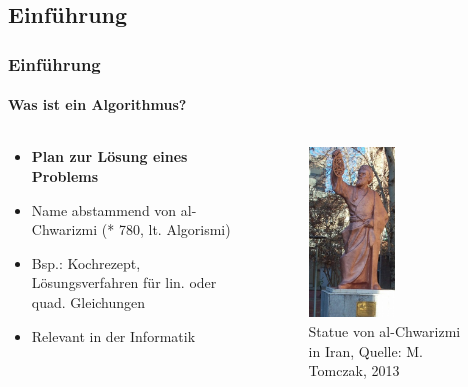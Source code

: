 \documentclass[professionalfont,serif,german]{beamer}
\begin{document}
\begin{frame}
  \section[Einführung in Algorithmen und Pathfinder]{Einführung}
  \frametitle{Einführung}
  \framesubtitle{Was ist ein Algorithmus?}
  \begin{columns}[c] %
    \begin{column}[T]{.5\textwidth} %
      \begin{itemize}
        \item \textbf{Plan zur Lösung eines Problems}
        \item Name abstammend von al-Chwarizmi (* 780, lt. Algorismi)
        \item Bsp.: Kochrezept, Lösungsverfahren für lin. oder quad. Gleichungen
        \item Relevant in der Informatik
      \end{itemize}
    \end{column}
    \begin{column}[T]{.5\textwidth}
      \begin{figure}
        \includegraphics[height=4.5cm]{img/algorismi.png}
        \caption{Statue von al-Chwarizmi in Iran, Quelle: M. Tomczak, 2013}
      \end{figure}
    \end{column}
  \end{columns}
\end{frame}
\end{document}
